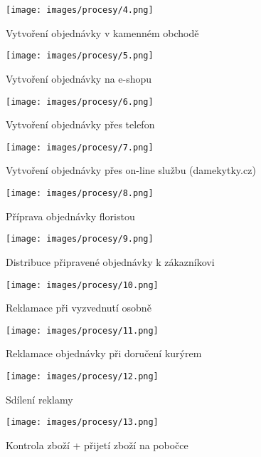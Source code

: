 \documentclass{article}
\begin{document}
\newpage
\begin{figure}[h]
\caption{Vytvoření objednávky v kamenném obchodě}
\texttt{[image: images/procesy/4.png]}
\end{figure}

\newpage
\begin{figure}[h]
\caption{Vytvoření objednávky na e-shopu}
\texttt{[image: images/procesy/5.png]}
\end{figure}

\newpage
\begin{figure}[h]
\caption{Vytvoření objednávky přes telefon}
\texttt{[image: images/procesy/6.png]}
\end{figure}

\newpage
\begin{figure}[h]
\caption{Vytvoření objednávky přes on-line službu (damekytky.cz)}
\texttt{[image: images/procesy/7.png]}
\end{figure}

\newpage
\begin{figure}[h]
\caption{Příprava objednávky floristou}
\texttt{[image: images/procesy/8.png]}
\end{figure}

\newpage
\begin{figure}[h]
\caption{Distribuce připravené objednávky k zákazníkovi}
\texttt{[image: images/procesy/9.png]}
\end{figure}

\newpage
\begin{figure}[h]
\caption{Reklamace při vyzvednutí osobně}
\texttt{[image: images/procesy/10.png]}
\end{figure}

\newpage
\begin{figure}[h]
\caption{Reklamace objednávky při doručení kurýrem}
\texttt{[image: images/procesy/11.png]}
\end{figure}

\newpage
\begin{figure}[h]
\caption{Sdílení reklamy}
\texttt{[image: images/procesy/12.png]}
\end{figure}

\newpage
\begin{figure}[h]
\caption{Kontrola zboží + přijetí zboží na pobočce}
\texttt{[image: images/procesy/13.png]}
\end{figure}
\end{document}
